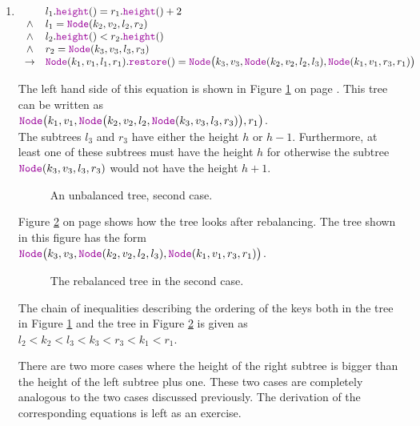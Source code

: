 \begin{enumerate}
\item $\begin{array}[t]{cl}
               & l_1.\mytt{height}() = r_1.\mytt{height}() + 2    \\ 
        \wedge & l_1 = \mytt{Node}(k_2,v_2,l_2,r_2)               \\
        \wedge & l_2.\mytt{height}() < r_2.\mytt{height}()     \\
        \wedge & r_2 = \mytt{Node}(k_3,v_3,l_3,r_3)               \\
        \rightarrow & \mytt{Node}(k_1,v_1,l_1,r_1).\mytt{restore}() = 
                      \mytt{Node}\bigl(k_3,v_3,\mytt{Node}(k_2,v_2,l_2,l_3),\mytt{Node}(k_1,v_1,r_3,r_1) \bigr)
        \end{array}
       $

       The left hand side of this equation is shown in Figure  \ref{fig:caselr} on page
       \pageref{fig:caselr}.  This tree can be written as
       \\[0.2cm]
       \hspace*{1.3cm} 
       $\mytt{Node}\bigl(k_1,v_1,\mytt{Node}\bigl(k_2,v_2,l_2,\mytt{Node}(k_3,v_3,l_3,r_3)\bigr),r_1\bigr)$. 
       \\[0.2cm]
       The subtrees $l_3$ and $r_3$ have either the height  $h$ or $h-1$.  Furthermore, at least one
       of these subtrees must have the height  $h$ for otherwise the subtree
       $\mytt{Node}(k_3,v_3,l_3,r_3)$ would not have the height $h+1$.
       
\begin{figure}[!ht]
  \centering
  \caption{An unbalanced tree, second case.}
  \label{fig:caselr}
\end{figure}

     Figure \ref{fig:caselr-nach} on page \pageref{fig:caselr-nach} shows how the tree looks after
     rebalancing.  The tree shown in this figure has the form
     \\[0.2cm]
     \hspace*{1.3cm} 
     $\mytt{Node}\bigl(k_3,v_3,\mytt{Node}(k_2,v_2,l_2,l_3),\mytt{Node}(k_1,v_1,r_3,r_1) \bigr)$.


\begin{figure}[!ht]
  \centering
  \caption{The rebalanced tree in the second case.}
  \label{fig:caselr-nach}
\end{figure}

      The chain of inequalities describing the ordering of the keys both in the tree in Figure \ref{fig:caselr} and the
      tree in Figure \ref{fig:caselr-nach} is given as
      \\[0.2cm]
      \hspace*{1.3cm} $l_2 < k_2 < l_3 < k_3 < r_3 < k_1 < r_1$.

      There are two more cases where the height of the right subtree is bigger than 
      the height of the left subtree plus one.  These two cases are completely analogous to the two
      cases discussed previously.  The derivation of the corresponding equations is left as an exercise.
\end{enumerate}

